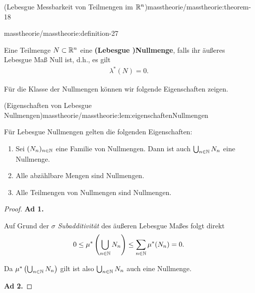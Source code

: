 \begin{theorem}{(Lebesgue Messbarkeit von Teilmengen im \protect\(\mathbb{R}^n\protect\))}{masstheorie/masstheorie:theorem-18}
\begin{definition}{}{masstheorie/masstheorie:definition-27}
\par
Eine Teilmenge \(N \subset \mathbb{R}^n\) eine \textbf{(Lebesgue )Nullmenge}, falls ihr äußeres Lebesgue Maß Null ist, d.h., es gilt
\begin{align*}
\lambda^*(N) = 0.
\end{align*}\end{definition}

\par
Für die Klasse der Nullmengen können wir folgende Eigenschaften zeigen.
\begin{lemma}{(Eigenschaften von Lebesgue Nullmengen)}{masstheorie/masstheorie:lem:eigenschaftenNullmengen}



\par
Für Lebesgue Nullmengen gelten die folgenden Eigenschaften:
\begin{enumerate}

\item {} 
\par
Sei \((N_n)_{n\in\mathbb{N}}\) eine Familie von Nullmengen.
Dann ist auch \(\bigcup_{n\in\mathbb{N}} N_n\) eine Nullmenge.

\item {} 
\par
Alle abzählbare Mengen sind Nullmengen.

\item {} 
\par
Alle Teilmengen von Nullmengen sind Nullmengen.

\end{enumerate}
\end{lemma}

\begin{proof}
 

\par
\textbf{Ad 1.}

\par
Auf Grund der \emph{\(\sigma\) Subadditivität} des äußeren Lebesgue Maßes folgt direkt
\begin{align*}
0 \leq \mu^* \left( \bigcup_{n\in\mathbb{N}} N_n \right) \leq \sum_{n\in\mathbb{N}} \mu^*(N_n) = 0.
\end{align*}
\par
Da \(\mu^* \left( \bigcup_{n\in\mathbb{N}} N_n \right)\) gilt ist also \(\bigcup_{n\in\mathbb{N}} N_n\) auch eine Nullmenge.

\par
\textbf{Ad 2.}


\end{proof}
\end{theorem}
